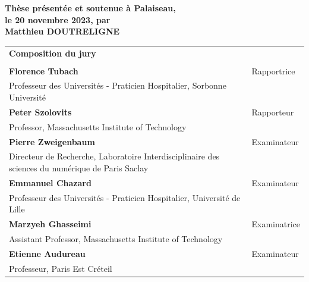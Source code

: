 \documentclass[french,12pt,twoside,a4paper]{book}
\begin{document}
\begin{titlepage}
  \textbf{Thèse présentée et soutenue à Palaiseau,\\ le 20 novembre 2023, par}\\
  \bigskip
  \Large {\color{Prune} \textbf{Matthieu DOUTRELIGNE}}


  \vspace{\fill} %

  \bigskip

  \flushleft

  \scriptsize
  \begin{tabular}{|p{9cm}l}
    \arrayrulecolor{Prune}
    {\footnotesize \textbf{Composition du jury}}                                                                    \\
                                                                                                     &              \\
    \textbf{Florence Tubach}                                                                         & Rapportrice  \\
    Professeur des Universités - Praticien Hospitalier, Sorbonne Université                          &              \\
    \textbf{Peter Szolovits}                                                                         & Rapporteur   \\
    Professor, Massachusetts Institute of Technology                                                 &              \\
    \textbf{Pierre Zweigenbaum}                                                                      & Examinateur  \\
    Directeur de Recherche, Laboratoire Interdisciplinaire des sciences du numérique de Paris Saclay &              \\
    \textbf{Emmanuel Chazard}                                                                        & Examinateur  \\
    Professeur des Universités - Praticien Hospitalier, Université de Lille                          &              \\
    \textbf{Marzyeh Ghasseimi}                                                                       & Examinatrice \\
    Assistant Professor, Massachusetts Institute of Technology                                       &              \\
    \textbf{Etienne Audureau}                                                                        & Examinateur  \\
    Professeur, Paris Est Créteil                                                                    &              \\
  \end{tabular}


\end{titlepage}
\end{document}
